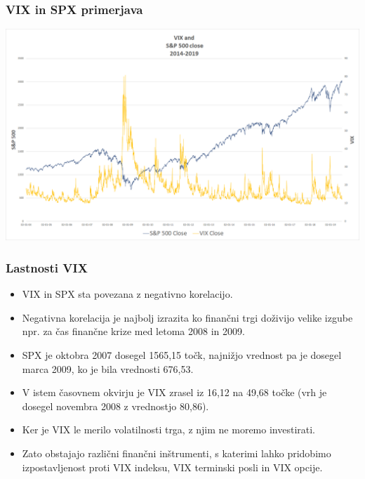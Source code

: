 \documentclass[10pt]{beamer}
\begin{document}
\begin{frame}
\frametitle{VIX in SPX primerjava}
\includegraphics[width=1\textwidth]{./Grafi/VIX vs SPX 2004-2019.png}
\end{frame}

\begin{frame}
\frametitle{Lastnosti VIX}
\begin{itemize}
\item VIX in SPX sta povezana z negativno korelacijo.
\item Negativna korelacija je najbolj izrazita ko finančni trgi doživijo velike izgube npr. za čas finančne krize med letoma 2008 in 2009. 
\item SPX je oktobra 2007 dosegel 1565,15 točk, najnižjo vrednost pa je dosegel marca 2009, ko je bila vrednosti 676,53. 
\item V istem časovnem okvirju je VIX zrasel iz 16,12 na 49,68 točke (vrh je dosegel novembra 2008 z vrednostjo 80,86). 
\item Ker je VIX le merilo volatilnosti trga, z njim ne moremo investirati.
\item Zato obstajajo različni finančni inštrumenti, s katerimi lahko pridobimo izpostavljenost proti VIX indeksu, VIX terminski posli in VIX opcije.
\end{itemize}
\end{frame}
\end{document}
